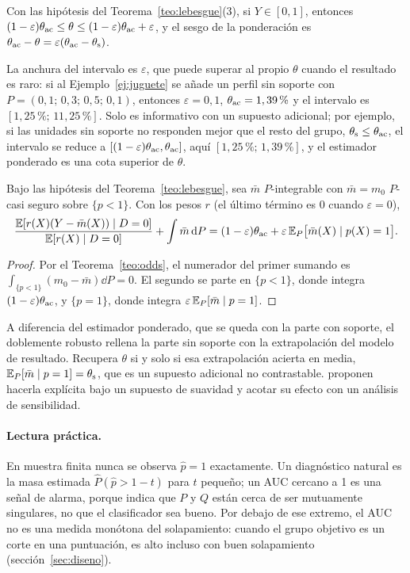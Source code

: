 \begin{corolario}\label{cor:cotas}
Con las hipótesis del Teorema~\ref{teo:lebesgue}(3), si $Y\in[0,1]$, entonces $(1-\varepsilon)\theta_{\mathrm{ac}}\le\theta\le(1-\varepsilon)\theta_{\mathrm{ac}}+\varepsilon$, y el sesgo de la ponderación es $\theta_{\mathrm{ac}}-\theta=\varepsilon(\theta_{\mathrm{ac}}-\theta_{\mathrm{s}})$.
\end{corolario}
La anchura del intervalo es $\varepsilon$, que puede superar al propio $\theta$ cuando el resultado es raro: si al Ejemplo~\ref{ej:juguete} se añade un perfil sin soporte con $P=(0,1;\,0,3;\,0,5;\,0,1)$, entonces $\varepsilon=0,1$, $\theta_{\mathrm{ac}}=1,39\,\%$ y el intervalo es $[1,25\,\%;\,11,25\,\%]$. Solo es informativo con un supuesto adicional; por ejemplo, si las unidades sin soporte no responden mejor que el resto del grupo, $\theta_{\mathrm{s}}\le\theta_{\mathrm{ac}}$, el intervalo se reduce a $[(1-\varepsilon)\theta_{\mathrm{ac}},\theta_{\mathrm{ac}}]$, aquí $[1,25\,\%;\,1,39\,\%]$, y el estimador ponderado es una cota superior de $\theta$.

\begin{corolario}\label{cor:drsinsoporte}
Bajo las hipótesis del Teorema~\ref{teo:lebesgue}, sea $\bar m$ $P$-integrable con $\bar m=m_0$ $P$-casi seguro sobre $\{p<1\}$. Con los pesos $r$ (el último término es $0$ cuando $\varepsilon=0$),
\[
\frac{\mathbb{E}[r(X)(Y-\bar m(X))\mid D=0]}{\mathbb{E}[r(X)\mid D=0]}+\int\bar m\,\mathrm{d} P=(1-\varepsilon)\theta_{\mathrm{ac}}+\varepsilon\,\mathbb{E}_P\bigl[\bar m(X)\mid p(X)=1\bigr].
\]
\end{corolario}
\begin{proof}
Por el Teorema~\ref{teo:odds}, el numerador del primer sumando es $\int_{\{p<1\}}(m_0-\bar m)\dd P=0$. El segundo se parte en $\{p<1\}$, donde integra $(1-\varepsilon)\theta_{\mathrm{ac}}$, y $\{p=1\}$, donde integra $\varepsilon\,\mathbb{E}_P[\bar m\mid p=1]$.
\end{proof}

A diferencia del estimador ponderado, que se queda con la parte con soporte, el doblemente robusto rellena la parte sin soporte con la extrapolación del modelo de resultado. Recupera $\theta$ si y solo si esa extrapolación acierta en media, $\mathbb{E}_P[\bar m\mid p=1]=\theta_{\mathrm{s}}$, que es un supuesto adicional no contrastable. \citet{manamkoong2025} proponen hacerla explícita bajo un supuesto de suavidad y acotar su efecto con un análisis de sensibilidad.

\paragraph{Lectura práctica.} En muestra finita nunca se observa $\hat p=1$ exactamente. Un diagnóstico natural es la masa estimada $\hat P(\hat p>1-t)$ para $t$ pequeño; un AUC cercano a 1 es una señal de alarma, porque indica que $P$ y $Q$ están cerca de ser mutuamente singulares, no que el clasificador sea bueno. Por debajo de ese extremo, el AUC no es una medida monótona del solapamiento: cuando el grupo objetivo es un corte en una puntuación, es alto incluso con buen solapamiento (sección~\ref{sec:diseno}).

